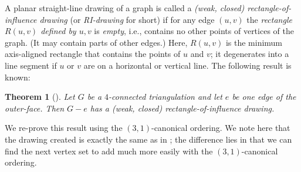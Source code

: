 \documentclass[12pt]{article}
\newtheorem{theorem}{Theorem}
\begin{document}
A planar straight-line drawing of a graph is called a {\em (weak, closed)
rectangle-of-influence drawing} (or {\em RI-drawing} for short) if
for any edge $(u,v)$ the {\em rectangle $R(u,v)$ defined by $u,v$} is
{\em empty}, i.e., contains no other points of vertices of the graph.  (It
may contain parts of other edges.)  Here,  $R(u,v)$ is the minimum
axis-aligned rectangle that contains the points of $u$ and $v$; it 
degenerates into a line segment if $u$ or $v$ are on a horizontal or
vertical line.  The following result is known:

\begin{theorem}[\cite{BBM-GD99}]
\label{thm:ri}
Let $G$ be a $4$-connected triangulation and let $e$ be one
edge of the outer-face.  Then $G-e$ has a (weak, closed) 
rectangle-of-influence drawing.
\end{theorem}

We re-prove this result using the $(3,1)$-canonical ordering.  We note
here that the drawing created is exactly the same as in \cite{BBM-GD99};
the difference lies in that we can find the next vertex set to add much
more easily with the $(3,1)$-canonical ordering.
\end{document}
